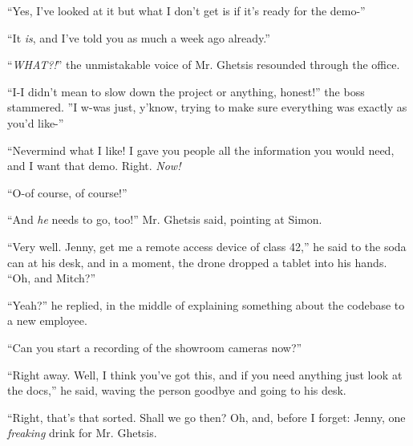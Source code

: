 \documentclass[10pt,a4paper]{article}
\newcommand{\lang}[2]{ #2 \par}
\newcommand{\ainame}{Jenny}
\newcommand{\mainname}{Simon}
\newcommand{\auxname}{Mitch}
\newcommand{\policename}{Mr. Ghetsis}
\begin{document}
\lang{-- Да, я туда уже посмотрел, но я вот не понял, готовы ли мы к демонстрации-}{``Yes, I've looked at it but what I don't get is if it's ready for the demo-''}
\lang{-- \emph{Готовы} же, я же уже неделю назад говорил.}{``It \emph{is}, and I've told you as much a week ago already.''}
\lang{-- \emph{ЧТО?!} -- неповторимый голос \policename{} прогремел по этажу.}{``\emph{WHAT?!}'' the unmistakable voice of \policename{} resounded through the office.}
\lang{-- Я-я не хотел задерживать этот п-проект, честно! -- начальник сказал, заикаясь. -- Я п-просто, знаете ли, п-пытался сделать так, ч-чтобы всё было, как вам понравится-}{``I-I didn't mean to slow down the project or anything, honest!'' the boss stammered. ''I w-was just, y'know, trying to make sure everything was exactly as you'd like-''}
\lang{-- А вот что мне понравится, вас не должно волновать! Вот я вам уже дал всё, что нужно знать, и хочу увидеть результат. Прямо. \emph{Сейчас!}}{``Nevermind what I like! I gave you people all the information you would need, and I want that demo. Right. \emph{Now!}}
\lang{--К-конечно, конечно!}{``O-of course, of course!''}
\lang{-- И пусть \emph{он} пойдёт с нами! -- сказал \policename{}, указывая на \mainname{}.}{``And \emph{he} needs to go, too!'' \policename{} said, pointing at \mainname{}.}
\lang{-- Хорошо. \ainame{}, принеси мне устройство удалённого доступа класса 42, -- сказал он жестяной банке на столе, и через пару секунд ему в руки упал планшет. -- Кстати, \auxname{}?}{``Very well. \ainame{}, get me a remote access device of class 42,'' he said to the soda can at his desk, and in a moment, the drone dropped a tablet into his hands. ``Oh, and \auxname{}?''}
\lang{-- Да? -- ответил он, прервавшись в объяснении кода новому сотруднику.}{``Yeah?'' he replied, in the middle of explaining something about the codebase to a new employee.}
\lang{-- А ты можешь включить запись камер в выставочном домике?}{``Can you start a recording of the showroom cameras now?''}
\lang{-- Сейчас будет. Ну, я думаю, ты тут разберешься и без меня, а если что-то нужно будет, ссылку на доки я тебе уже оставил,-- сказал он, попрощавшись с сотрудником и направившись к своему столу.}{``Right away. Well, I think you've got this, and if you need anything just look at the docs,'' he said, waving the person goodbye and going to his desk.}
\lang{-- Так с этим разобрались. Пройдёмте же? Ах, да, совсем забыл: один \emph{грёбанный} напиток специально для \policename{}.}{``Right, that's that sorted. Shall we go then? Oh, and, before I forget: \ainame{}, one \emph{freaking} drink for \policename{}.}
\end{document}
